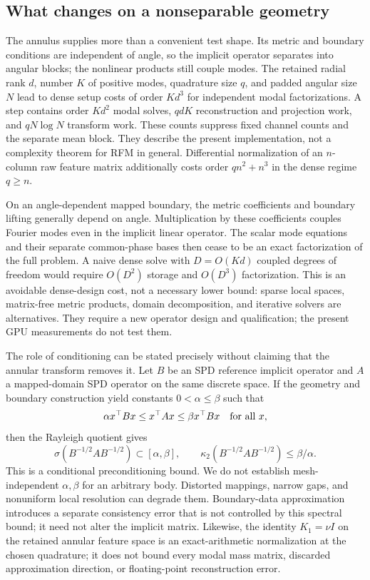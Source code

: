\subsection{What changes on a nonseparable geometry}
\label{sec:geometry-scope}

The annulus supplies more than a convenient test shape. Its metric and boundary conditions are independent of angle, so the implicit operator separates into angular blocks; the nonlinear products still couple modes. The retained radial rank $d$, number $K$ of positive modes, quadrature size $q$, and padded angular size $N$ lead to dense setup costs of order $Kd^3$ for independent modal factorizations. A step contains order $Kd^2$ modal solves, $qdK$ reconstruction and projection work, and $qN\log N$ transform work. These counts suppress fixed channel counts and the separate mean block. They describe the present implementation, not a complexity theorem for RFM in general. Differential normalization of an $n$-column raw feature matrix additionally costs order $qn^2+n^3$ in the dense regime $q\geq n$.

On an angle-dependent mapped boundary, the metric coefficients and boundary lifting generally depend on angle. Multiplication by these coefficients couples Fourier modes even in the implicit linear operator. The scalar mode equations and their separate common-phase bases then cease to be an exact factorization of the full problem. A naive dense solve with $D=O(Kd)$ coupled degrees of freedom would require $O(D^2)$ storage and $O(D^3)$ factorization. This is an avoidable dense-design cost, not a necessary lower bound: sparse local spaces, matrix-free metric products, domain decomposition, and iterative solvers are alternatives. They require a new operator design and qualification; the present GPU measurements do not test them.

The role of conditioning can be stated precisely without claiming that the annular transform removes it. Let $B$ be an SPD reference implicit operator and $A$ a mapped-domain SPD operator on the same discrete space. If the geometry and boundary construction yield constants $0<\alpha\leq\beta$ such that
\begin{equation}
 \alpha x^\top Bx\leq x^\top Ax\leq\beta x^\top Bx
 \quad\hbox{for all }x,
 \label{eq:geometry-equivalence}
\end{equation}
then the Rayleigh quotient gives
\begin{equation}
 \sigma(B^{-1/2}AB^{-1/2})\subset[\alpha,\beta],\qquad
 \kappa_2(B^{-1/2}AB^{-1/2})\leq\beta/\alpha.
 \label{eq:geometry-condition}
\end{equation}
This is a conditional preconditioning bound. We do not establish mesh-independent $\alpha,\beta$ for an arbitrary body. Distorted mappings, narrow gaps, and nonuniform local resolution can degrade them. Boundary-data approximation introduces a separate consistency error that is not controlled by this spectral bound; it need not alter the implicit matrix. Likewise, the identity $K_1=\nu I$ on the retained annular feature space is an exact-arithmetic normalization at the chosen quadrature; it does not bound every modal mass matrix, discarded approximation direction, or floating-point reconstruction error.

